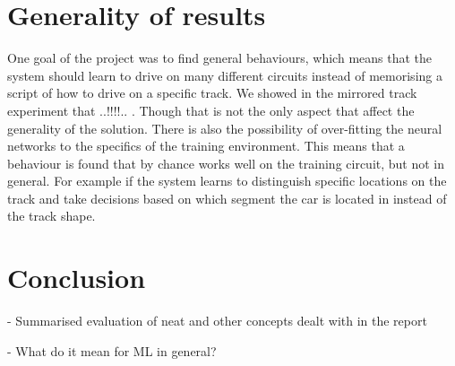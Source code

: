 \section{Generality of results}
One goal of the project was to find general behaviours, which means that the system should learn to drive on many different circuits instead of memorising a script of how to drive on a specific track. We showed in the mirrored track experiment that ..!!!!.. . Though that is not the only aspect that affect the generality of the solution. 
There is also the possibility of over-fitting the neural networks to the specifics of the training environment. This means that a behaviour is found that by chance works well on the training circuit, but not in general. For example if the system learns to distinguish specific locations on the track and take decisions based on which segment the car is located in instead of the track shape.


\section{Conclusion}
- Summarised evaluation of neat and other concepts dealt with in the report

- What do it mean for ML in general?






